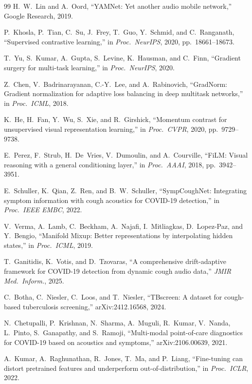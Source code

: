 \documentclass[journal]{IEEEtran}
\begin{document}
\begin{thebibliography}{99}
H.~W.~Lin and A.~Oord,
``YAMNet: Yet another audio mobile network,'' Google Research, 2019.

P.~Khosla, P.~Tian, C.~Su, J.~Frey, T.~Guo, Y.~Schmid, and C.~Ranganath,
``Supervised contrastive learning,''
in \emph{Proc.\ NeurIPS}, 2020, pp.~18661--18673.

T.~Yu, S.~Kumar, A.~Gupta, S.~Levine, K.~Hausman, and C.~Finn,
``Gradient surgery for multi-task learning,''
in \emph{Proc.\ NeurIPS}, 2020.

Z.~Chen, V.~Badrinarayanan, C.-Y.~Lee, and A.~Rabinovich,
``GradNorm: Gradient normalization for adaptive loss balancing in deep
multitask networks,'' in \emph{Proc.\ ICML}, 2018.

K.~He, H.~Fan, Y.~Wu, S.~Xie, and R.~Girshick,
``Momentum contrast for unsupervised visual representation learning,''
in \emph{Proc.\ CVPR}, 2020, pp.~9729--9738.

E.~Perez, F.~Strub, H.~De~Vries, V.~Dumoulin, and A.~Courville,
``FiLM: Visual reasoning with a general conditioning layer,''
in \emph{Proc.\ AAAI}, 2018, pp.~3942--3951.

E.~Schuller, K.~Qian, Z.~Ren, and B.~W.~Schuller,
``SympCoughNet: Integrating symptom information with cough acoustics
for COVID-19 detection,''
in \emph{Proc.\ IEEE EMBC}, 2022.

V.~Verma, A.~Lamb, C.~Beckham, A.~Najafi, I.~Mitliagkas, D.~Lopez-Paz,
and Y.~Bengio,
``Manifold Mixup: Better representations by interpolating hidden states,''
in \emph{Proc.\ ICML}, 2019.

T.~Ganitidis, K.~Votis, and D.~Tzovaras,
``A comprehensive drift-adaptive framework for COVID-19 detection from
dynamic cough audio data,''
\emph{JMIR Med.\ Inform.}, 2025.

C.~Botha, C.~Niesler, C.~Loos, and T.~Niesler,
``TBscreen: A dataset for cough-based tuberculosis screening,''
arXiv:2412.16568, 2024.

N.~Chetupalli, P.~Krishnan, N.~Sharma, A.~Muguli, R.~Kumar,
V.~Nanda, L.~Pinto, S.~Ganapathy, and S.~Ramoji,
``Multi-modal point-of-care diagnostics for COVID-19 based on
acoustics and symptoms,'' arXiv:2106.00639, 2021.

A.~Kumar, A.~Raghunathan, R.~Jones, T.~Ma, and P.~Liang,
``Fine-tuning can distort pretrained features and underperform
out-of-distribution,'' in \emph{Proc.\ ICLR}, 2022.

\end{thebibliography}
\end{document}

